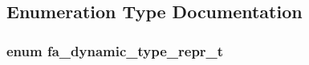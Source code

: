 \subsection{Enumeration Type Documentation}
\hypertarget{group___fa_dynamic_ga38427e999172dad2684f07793859f416}{
\subsubsection[{fa\-\_\-dynamic\-\_\-type\-\_\-repr\-\_\-t}]{\setlength{\rightskip}{0pt plus 5cm}enum {\bf fa\-\_\-dynamic\-\_\-type\-\_\-repr\-\_\-t}}}\label{group___fa_dynamic_ga38427e999172dad2684f07793859f416}
